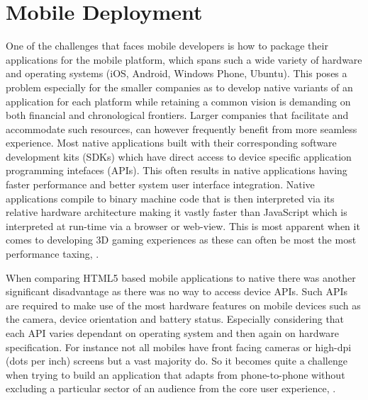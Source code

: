 \documentclass[final]{cmpreport}
\begin{document}
\section{Mobile Deployment}
One of the challenges that faces mobile developers is how to package their applications for the mobile platform, which spans such a wide variety of hardware and operating systems (iOS\footnotemark, Android\footnotemark, Windows Phone\footnotemark, Ubuntu\footnotemark). This poses a problem especially for the smaller companies as to develop native variants of an application for each platform while retaining a common vision is demanding on both financial and chronological frontiers. Larger companies that facilitate and accommodate such resources, can however frequently benefit from more seamless experience. Most native applications built with their corresponding software development kits (SDKs) which have direct access to device specific application programming intefaces (APIs). This often results in native applications having faster performance and better system user interface integration. Native applications compile to binary machine code that is then interpreted via its relative hardware architecture making it vastly faster than JavaScript which is interpreted at run-time via a browser or web-view. This is most apparent when it comes to developing 3D gaming experiences as these can often be most the most performance taxing, \cite{Kulloli}.


When comparing HTML5 based mobile applications to native there was another significant disadvantage as there was no way to access device APIs. Such APIs are required to make use of the most hardware features on mobile devices such as the camera, device orientation and battery status. Especially considering that each API varies dependant on operating system and then again on hardware specification. For instance not all mobiles have front facing cameras or high-dpi (dots per inch) screens but a vast majority do. So it becomes quite a challenge when trying to build an application that adapts from phone-to-phone without excluding a particular sector of an audience from the core user experience, \cite{Charland}.
\end{document}
